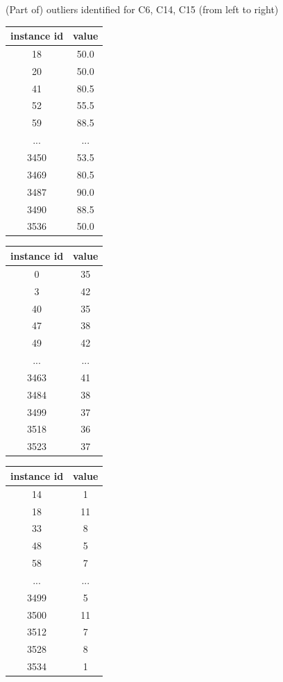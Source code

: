 \documentclass{article}
\begin{document}
\begin{description}
\begin{itemize}
				(Part of) outliers identified for C6, C14, C15 (from left to right)
				\begin{center}
					\begin{tabular}{|c|c|}
						\hline
						instance id & value \\
						\hline
						18    & 50.0 \\
						20    & 50.0 \\
						41    & 80.5 \\
						52    & 55.5 \\
						59    & 88.5 \\
						...   & ... \\
						3450  & 53.5 \\
						3469  & 80.5 \\
						3487  & 90.0 \\
						3490  & 88.5 \\
						3536  & 50.0 \\
						\hline
					\end{tabular}
					\begin{tabular}{|c|c|}
						\hline
						instance id & value \\
						\hline
						0      & 35 \\
						3      & 42 \\
						40     & 35 \\
						47     & 38 \\
						49     & 42 \\
						...    & ... \\
						3463   & 41 \\
						3484   & 38 \\
						3499   & 37 \\
						3518   & 36 \\
						3523   & 37 \\
						\hline
					\end{tabular}
					\begin{tabular}{|c|c|}
						\hline
						instance id & value \\
						\hline
						14     & 1  \\
						18     & 11 \\ 
						33     & 8  \\
						48     & 5  \\
						58     & 7  \\
						...    & ...\\
						3499   & 5  \\
						3500   & 11 \\
						3512   & 7  \\
						3528   & 8  \\
						3534   & 1  \\
						\hline
					\end{tabular}
				\end{center}


\end{itemize}
\end{description}
\end{document}
